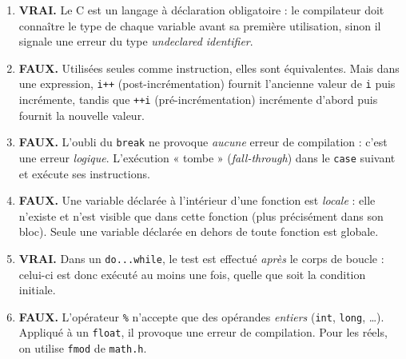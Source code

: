\documentclass[11pt]{article}
\begin{document}
\begin{corrige}
\begin{enumerate}
\item \textbf{VRAI.} Le C est un langage à déclaration obligatoire : le compilateur doit connaître le type de chaque variable avant sa première utilisation, sinon il signale une erreur du type \emph{undeclared identifier}.
\item \textbf{FAUX.} Utilisées seules comme instruction, elles sont équivalentes. Mais dans une expression, \texttt{i++} (post-incrémentation) fournit l'ancienne valeur de \texttt{i} puis incrémente, tandis que \texttt{++i} (pré-incrémentation) incrémente d'abord puis fournit la nouvelle valeur.
\item \textbf{FAUX.} L'oubli du \texttt{break} ne provoque \emph{aucune} erreur de compilation : c'est une erreur \emph{logique}. L'exécution « tombe » (\emph{fall-through}) dans le \texttt{case} suivant et exécute ses instructions.
\item \textbf{FAUX.} Une variable déclarée à l'intérieur d'une fonction est \emph{locale} : elle n'existe et n'est visible que dans cette fonction (plus précisément dans son bloc). Seule une variable déclarée en dehors de toute fonction est globale.
\item \textbf{VRAI.} Dans un \texttt{do...while}, le test est effectué \emph{après} le corps de boucle : celui-ci est donc exécuté au moins une fois, quelle que soit la condition initiale.
\item \textbf{FAUX.} L'opérateur \texttt{\%} n'accepte que des opérandes \emph{entiers} (\texttt{int}, \texttt{long}, \dots). Appliqué à un \texttt{float}, il provoque une erreur de compilation. Pour les réels, on utilise \texttt{fmod} de \texttt{math.h}.
\end{enumerate}
\end{corrige}
\end{document}
